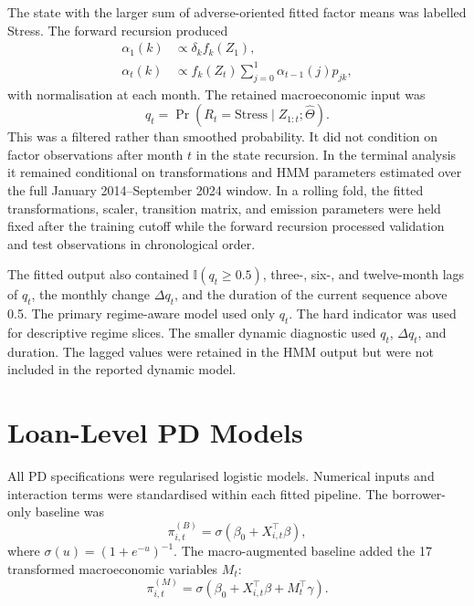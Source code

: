 The state with the larger sum of adverse-oriented fitted factor means was labelled Stress. The forward recursion produced
\begin{align}
\alpha_1(k)&\propto\delta_k f_k(Z_1),\\
\alpha_t(k)&\propto f_k(Z_t)\sum_{j=0}^{1}\alpha_{t-1}(j)p_{jk},
\end{align}
with normalisation at each month. The retained macroeconomic input was
\begin{equation}
q_t
=
\Pr(R_t=\mathrm{Stress}\mid Z_{1:t};\widehat\Theta).
\label{eq:filtered-stress}
\end{equation}
This was a filtered rather than smoothed probability. It did not condition on factor observations after month $t$ in the state recursion. In the terminal analysis it remained conditional on transformations and HMM parameters estimated over the full January 2014--September 2024 window. In a rolling fold, the fitted transformations, scaler, transition matrix, and emission parameters were held fixed after the training cutoff while the forward recursion processed validation and test observations in chronological order.

The fitted output also contained $\mathbb{I}(q_t\geq0.5)$, three-, six-, and twelve-month lags of $q_t$, the monthly change $\Delta q_t$, and the duration of the current sequence above 0.5. The primary regime-aware model used only $q_t$. The hard indicator was used for descriptive regime slices. The smaller dynamic diagnostic used $q_t$, $\Delta q_t$, and duration. The lagged values were retained in the HMM output but were not included in the reported dynamic model.

\section{Loan-Level PD Models}

All PD specifications were regularised logistic models. Numerical inputs and interaction terms were standardised within each fitted pipeline. The borrower-only baseline was
\begin{equation}
\pi_{i,t}^{(B)}
=
\sigma\!\left(\beta_0+X_{i,t}^{\top}\beta\right),
\label{eq:borrower-baseline}
\end{equation}
where $\sigma(u)=(1+e^{-u})^{-1}$. The macro-augmented baseline added the 17 transformed macroeconomic variables $M_t$:
\begin{equation}
\pi_{i,t}^{(M)}
=
\sigma\!\left(\beta_0+X_{i,t}^{\top}\beta+M_t^{\top}\gamma\right).
\label{eq:macro-baseline}
\end{equation}

